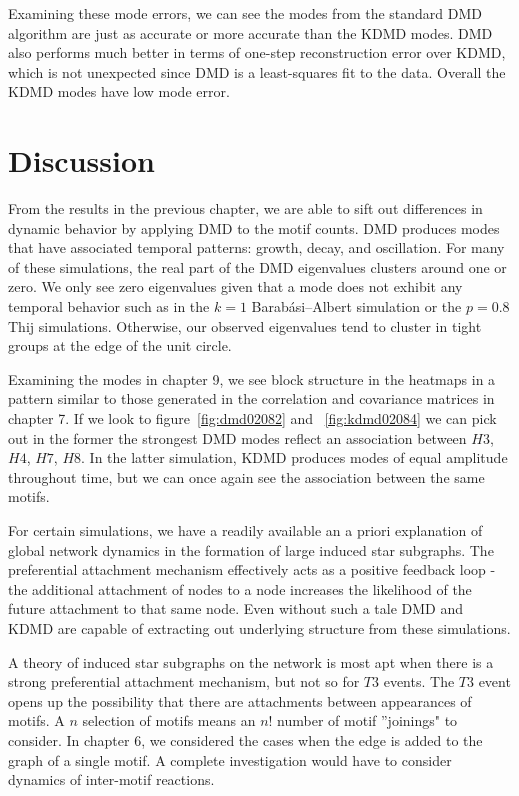 \FloatBarrier

Examining these mode errors, we can see the modes
from the standard DMD algorithm are just as accurate or more 
 accurate than the KDMD modes. DMD also performs much better in terms of one-step
reconstruction error over KDMD, which is not unexpected since 
DMD is a least-squares fit to the data. Overall the KDMD modes have low mode error.

\chapter{Discussion}

From the results in the previous chapter, we are able to sift out differences in dynamic behavior by applying
 DMD to the motif counts. DMD produces modes that have associated temporal
patterns: growth, decay, and oscillation. For many of these simulations, the real part of
 the DMD eigenvalues clusters around one or zero. We only see zero eigenvalues
given that a mode does not exhibit any temporal behavior such as in the $k=1$ Barabási–Albert 
simulation or the $p=0.8$ Thij simulations. Otherwise, our observed eigenvalues tend to cluster
in tight groups at the edge of the unit circle. 

Examining the modes in chapter 9, we see block structure in the heatmaps in a pattern similar to those 
generated in the correlation and covariance matrices in chapter 7. If we look to 
figure~\ref{fig:dmd02082} and ~\ref{fig:kdmd02084} we can pick out in the former the strongest
DMD modes reflect an association between $H3$, $H4$, $H7$, $H8$. In the latter simulation, KDMD produces
modes of equal amplitude throughout time, but we can once again see the association between the same motifs. 

For certain simulations, we have a readily available an a priori explanation
of global network dynamics in the formation of large induced star subgraphs. The preferential
attachment mechanism effectively acts as a positive feedback loop - the
additional attachment of nodes to a node increases
the likelihood of the future attachment to that same node. Even without 
 such a tale DMD and KDMD are capable of extracting out underlying 
structure from these simulations.

A theory of induced star subgraphs on the network is most apt when
there is a strong preferential attachment mechanism, but not so for $T3$ events. 
The $T3$ event opens up the possibility that there are attachments between appearances of 
motifs. A $n$ selection of motifs means an $n!$ number of motif ''joinings" to consider. In chapter 6,
 we considered the cases when the edge is added to the graph of a single motif. A complete 
 investigation would have to consider dynamics of inter-motif reactions. 

